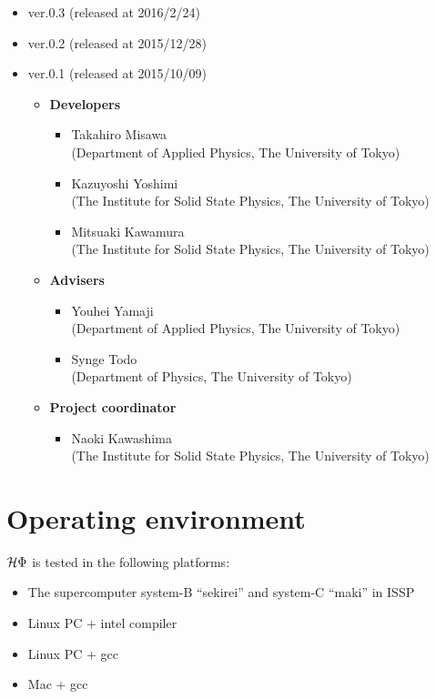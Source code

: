 \begin{itemize}
\item{ver.0.3 (released at 2016/2/24)}
\item{ver.0.2 (released at 2015/12/28)}
\item{ver.0.1 (released at 2015/10/09)}
\begin{itemize}
	\item{\bf Developers}
	\begin{itemize}
	\item{Takahiro Misawa \\(Department of Applied Physics, The University of Tokyo)}
	\item{Kazuyoshi Yoshimi\\ (The Institute for Solid State Physics, The University of Tokyo)}
	\item{Mitsuaki Kawamura\\ (The Institute for Solid State Physics, The University of Tokyo)}
	\end{itemize}
	\item{\bf Advisers}
	\begin{itemize}
	\item{Youhei Yamaji\\ (Department of Applied Physics, The University of Tokyo)}
	\item{Synge Todo\\ (Department of Physics, The University of Tokyo)}
	\end{itemize}
	\item{\bf Project coordinator}
	\begin{itemize}
	\item{Naoki Kawashima\\ (The Institute for Solid State Physics, The University of Tokyo)}
	\end{itemize}
\end{itemize}
\end{itemize}

\section{Operating environment}
 $\mathcal{H} \Phi$ is tested in the following platforms:

\begin{itemize}
\item The supercomputer system-B ``sekirei'' and system-C ``maki'' in ISSP
\item Linux PC + intel compiler
\item Linux PC + gcc
\item Mac + gcc
\end{itemize}
